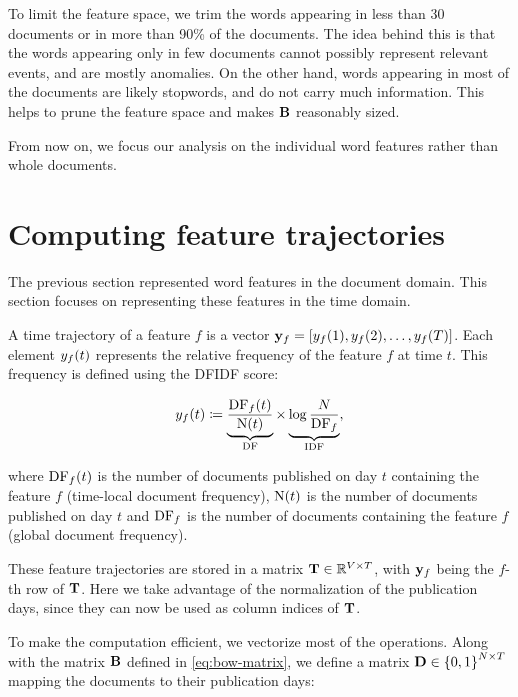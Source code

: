 To limit the feature space, we trim the words appearing in less than 30 documents or in more than 90\% of the documents. The idea behind this is that the words appearing only in few documents cannot possibly represent relevant events, and are mostly anomalies. On the other hand, words appearing in most of the documents are likely stopwords, and do not carry much information. This helps to prune the feature space and makes $\mathbf{B}$ reasonably sized.

From now on, we focus our analysis on the individual word features rather than whole documents.


\section{Computing feature trajectories}
The previous section represented word features in the document domain. This section focuses on representing these features in the time domain.

A time trajectory of a feature $f$ is a vector $\vect{\traj}_f = \left[ \traj_{f}(1), \traj_{f}(2), \dots, \traj_{f}(\streamlen) \right]$. Each element $y_{f}(t)$ represents the relative frequency of the feature $f$ at time $t$. This frequency is defined using the DFIDF score:

\begin{equation}
	y_{f}(t) \coloneqq \underbrace{\frac{\text{DF}_{f}(t)}{\text{N}(t)}}_{\text{DF}} \times \underbrace{\log{\frac{N}{\text{DF}_{f}}}}_{\text{IDF}},
\end{equation}

where $\text{DF}_{f}(t)$ is the number of documents published on day $t$ containing the feature $f$ (time-local document frequency), $\text{N}(t)$ is the number of documents published on day $t$ and $\text{DF}_{f}$ is the number of documents containing the feature $f$ (global document frequency).

These feature trajectories are stored in a matrix $\mathbf{T} \in \mathbb{R}^{V \times T}$, with $\vect{\traj}_f$ being the $f$-th row of $\mathbf{T}$. Here we take advantage of the normalization of the publication days, since they can now be used as column indices of $\mathbf{T}$.

To make the computation efficient, we vectorize most of the operations. Along with the matrix $\mathbf{B}$ defined in \ref{eq:bow-matrix}, we define a matrix $\mathbf{D} \in \left\{ 0, 1 \right\}^{N \times T}$ mapping the documents to their publication days:

